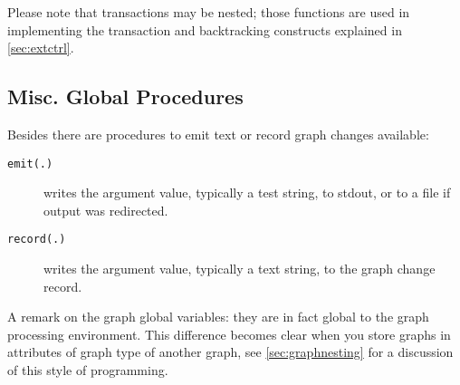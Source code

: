 Please note that transactions may be nested; those functions are used in implementing the transaction and backtracking constructs explained in \ref{sec:extctrl}.


\subsection{Misc. Global Procedures}

Besides there are procedures to emit text or record graph changes available: 

\begin{description}
\item[\texttt{emit(.)}] writes the argument value, typically a test string, to stdout, or to a file if output was redirected. 
\item[\texttt{record(.)}] writes the argument value, typically a text string, to the graph change record.
\end{description}

A remark on the graph global variables: they are in fact global to the graph processing environment.
This difference becomes clear when you store graphs in attributes of graph type of another graph, see \ref{sec:graphnesting} for a discussion of this style of programming.


